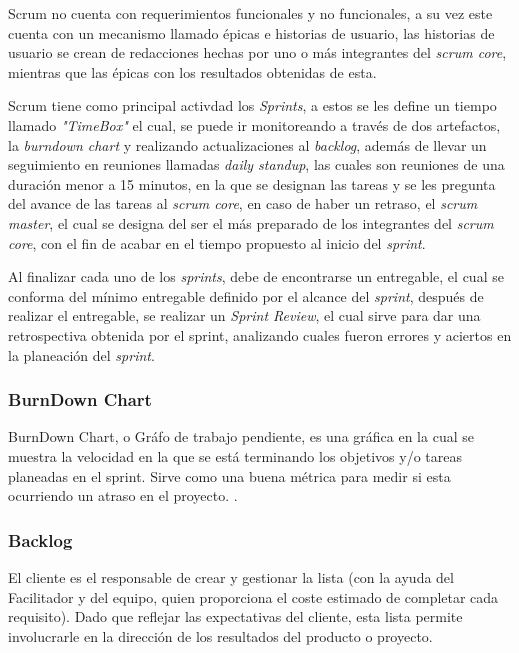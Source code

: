 \documentclass[10pt]{article}
\begin{document}
Scrum no cuenta con requerimientos funcionales y no funcionales, a su vez este cuenta con un mecanismo llamado épicas e historias de usuario, las historias de usuario se crean de redacciones hechas por uno o más integrantes del \textit{scrum core}, mientras que las épicas con los resultados obtenidas de esta.\newline

\setlength{\parskip}{2mm}

Scrum tiene como principal activdad los \textit{Sprints}, a estos se les define un tiempo llamado \textit{"TimeBox"} el cual, se puede ir monitoreando a través de dos artefactos, la \textit{burndown chart} y realizando actualizaciones al \textit{backlog}, además de llevar un seguimiento en reuniones llamadas \textit{daily standup}, las cuales son reuniones de una duración menor a 15 minutos, en la que se designan las tareas y se les pregunta del avance de las tareas al \textit{scrum core}, en caso de haber un retraso, el \textit{scrum master}, el cual se designa del ser el más preparado de los integrantes del \textit{scrum core}, con el fin de acabar en el tiempo propuesto al inicio del \textit{sprint}.\newline

\setlength{\parskip}{2mm}

Al finalizar cada uno de los \textit{sprints}, debe de encontrarse un entregable, el cual se conforma del mínimo entregable definido por el alcance del \textit{sprint}, después de realizar el entregable, se realizar un \textit{Sprint Review}, el cual sirve para dar una retrospectiva obtenida por el sprint, analizando cuales fueron errores y aciertos en la planeación del \textit{sprint}.\newline

\subsubsection{BurnDown Chart}
BurnDown Chart, o Gráfo de trabajo pendiente, es una gráfica en la cual se muestra la velocidad en la que se está terminando los objetivos y/o tareas planeadas en el sprint. Sirve como una buena métrica para medir si esta ocurriendo un atraso en el proyecto.
\cite{IEEEreferencias:Ref3}.

\subsubsection{Backlog}
El cliente es el responsable de crear y gestionar la lista (con la ayuda del Facilitador y del equipo, quien proporciona el coste estimado de completar cada requisito). Dado que reflejar las expectativas del cliente, esta lista permite involucrarle en la dirección de los resultados del producto o proyecto.
\end{document}
